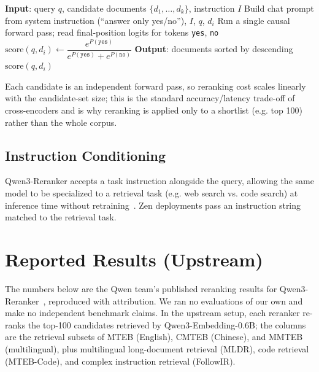 \documentclass[11pt,letterpaper]{article}
\begin{document}
\begin{algorithm}
\caption{Reranking with Qwen3-Reranker}
\begin{algorithmic}
\STATE \textbf{Input}: query $q$, candidate documents $\{d_1,\dots,d_k\}$, instruction $I$
  \STATE Build chat prompt from system instruction (``answer only yes/no''), $I$, $q$, $d_i$
  \STATE Run a single causal forward pass; read final-position logits for tokens \texttt{yes}, \texttt{no}
  \STATE $\mathrm{score}(q,d_i) \gets \dfrac{e^{P(\texttt{yes})}}{e^{P(\texttt{yes})}+e^{P(\texttt{no})}}$
\ENDFOR
\STATE \textbf{Output}: documents sorted by descending $\mathrm{score}(q,d_i)$
\end{algorithmic}
\end{algorithm}

Each candidate is an independent forward pass, so reranking cost scales linearly with the
candidate-set size; this is the standard accuracy/latency trade-off of cross-encoders and is
why reranking is applied only to a shortlist (e.g. top 100) rather than the whole corpus.

\subsection{Instruction Conditioning}

Qwen3-Reranker accepts a task instruction alongside the query, allowing the same model to be
specialized to a retrieval task (e.g. web search vs. code search) at inference time without
retraining~\cite{qwen3embedding}. Zen deployments pass an instruction string matched to the
retrieval task.

\section{Reported Results (Upstream)}

The numbers below are the Qwen team's published reranking results for
Qwen3-Reranker~\cite{qwen3embedding}, reproduced with attribution. We ran no evaluations of
our own and make no independent benchmark claims. In the upstream setup, each reranker
re-ranks the top-100 candidates retrieved by Qwen3-Embedding-0.6B; the columns are the
retrieval subsets of MTEB (English), CMTEB (Chinese), and MMTEB (multilingual), plus
multilingual long-document retrieval (MLDR), code retrieval (MTEB-Code), and complex
instruction retrieval (FollowIR).
\end{document}
